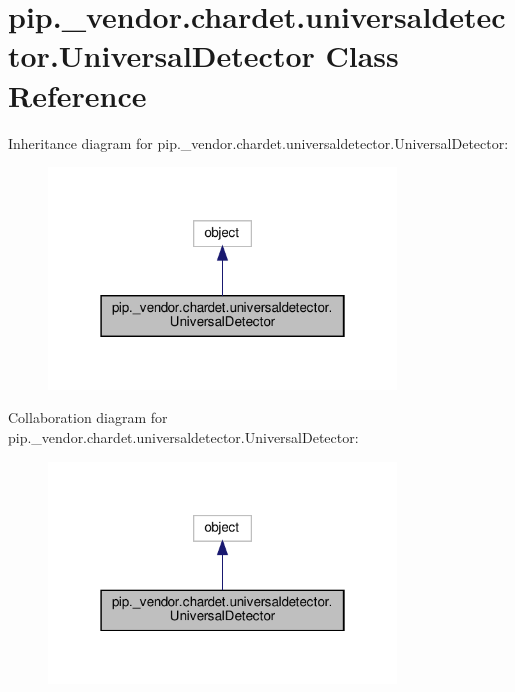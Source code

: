 \hypertarget{classpip_1_1__vendor_1_1chardet_1_1universaldetector_1_1UniversalDetector}{}\section{pip.\+\_\+vendor.\+chardet.\+universaldetector.\+Universal\+Detector Class Reference}
\label{classpip_1_1__vendor_1_1chardet_1_1universaldetector_1_1UniversalDetector}


Inheritance diagram for pip.\+\_\+vendor.\+chardet.\+universaldetector.\+Universal\+Detector\+:
\nopagebreak
\begin{figure}[H]
\begin{center}
\leavevmode
\includegraphics[width=262pt]{classpip_1_1__vendor_1_1chardet_1_1universaldetector_1_1UniversalDetector__inherit__graph}
\end{center}
\end{figure}


Collaboration diagram for pip.\+\_\+vendor.\+chardet.\+universaldetector.\+Universal\+Detector\+:
\nopagebreak
\begin{figure}[H]
\begin{center}
\leavevmode
\includegraphics[width=262pt]{classpip_1_1__vendor_1_1chardet_1_1universaldetector_1_1UniversalDetector__coll__graph}
\end{center}
\end{figure}

